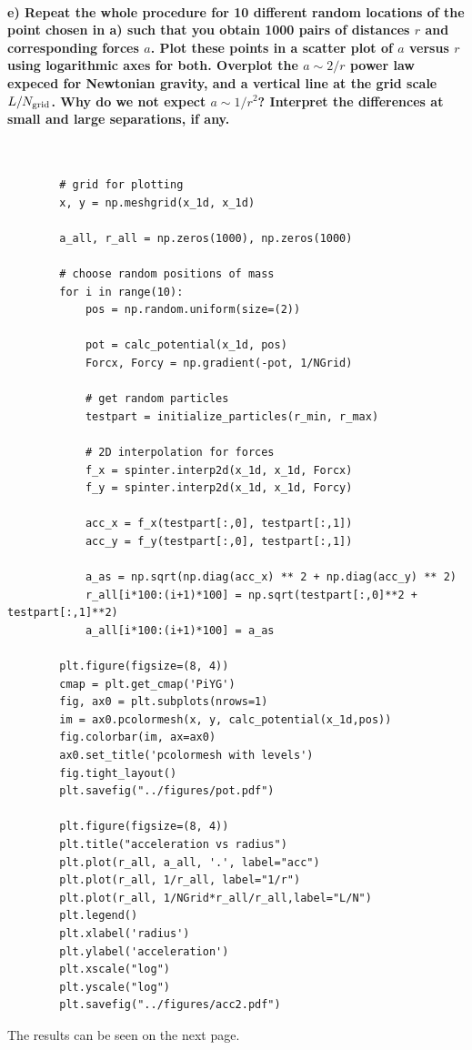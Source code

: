 \newpage
\paragraph{e) Repeat the whole procedure for 10 different random locations of 
    the point chosen in a) such that you obtain 1000 pairs of distances $r$ and 
    corresponding forces $a$. Plot these points in a scatter plot of $a$ versus
    $r$ using logarithmic axes for both. Overplot the $a\sim2/r$ power law 
    expeced for Newtonian gravity, and a vertical line at the grid scale 
    $L/N_\textnormal{grid}$. Why do we not expect $a\sim1/r^2$? Interpret the 
    differences at small and large separations, if any.
} \ \\
    \begin{lstlisting}
        # grid for plotting
        x, y = np.meshgrid(x_1d, x_1d)

        a_all, r_all = np.zeros(1000), np.zeros(1000)

        # choose random positions of mass
        for i in range(10):
            pos = np.random.uniform(size=(2))

            pot = calc_potential(x_1d, pos)
            Forcx, Forcy = np.gradient(-pot, 1/NGrid)

            # get random particles
            testpart = initialize_particles(r_min, r_max)

            # 2D interpolation for forces
            f_x = spinter.interp2d(x_1d, x_1d, Forcx)
            f_y = spinter.interp2d(x_1d, x_1d, Forcy)
        
            acc_x = f_x(testpart[:,0], testpart[:,1])
            acc_y = f_y(testpart[:,0], testpart[:,1])

            a_as = np.sqrt(np.diag(acc_x) ** 2 + np.diag(acc_y) ** 2)
            r_all[i*100:(i+1)*100] = np.sqrt(testpart[:,0]**2 + testpart[:,1]**2)
            a_all[i*100:(i+1)*100] = a_as
        
        plt.figure(figsize=(8, 4))
        cmap = plt.get_cmap('PiYG')
        fig, ax0 = plt.subplots(nrows=1)
        im = ax0.pcolormesh(x, y, calc_potential(x_1d,pos))
        fig.colorbar(im, ax=ax0)
        ax0.set_title('pcolormesh with levels')
        fig.tight_layout()
        plt.savefig("../figures/pot.pdf")

        plt.figure(figsize=(8, 4))
        plt.title("acceleration vs radius")
        plt.plot(r_all, a_all, '.', label="acc")
        plt.plot(r_all, 1/r_all, label="1/r")
        plt.plot(r_all, 1/NGrid*r_all/r_all,label="L/N")
        plt.legend()
        plt.xlabel('radius')
        plt.ylabel('acceleration')
        plt.xscale("log")
        plt.yscale("log")
        plt.savefig("../figures/acc2.pdf")\end{lstlisting}
        The results can be seen on the next page.

